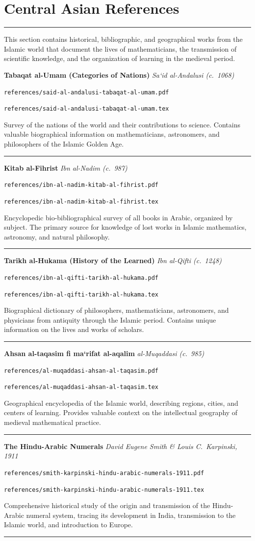 \documentclass[11pt,a4paper]{article}
\newcommand{\workitem}[5]{%
  \par\smallskip
  \noindent\textbf{\large #1} \hfill \textit{#2}\par
  \noindent\texttt{\small #3}\par
  \noindent\texttt{\small #4}\par
  \noindent #5\par
  \smallskip\noindent\rule{\textwidth}{0.2pt}
}
\newcommand{\referencesection}[1]{%
  \section[{#1}]{\textcolor{refcolor}{#1}}
}
\begin{document}
\newpage

\referencesection{Central Asian References}
\label{sec:references}

\begin{center}
\textcolor{refcolor}{\rule{0.8\textwidth}{1pt}}
\end{center}

This section contains historical, bibliographic, and geographical works from the Islamic world that document the lives of mathematicians, the transmission of scientific knowledge, and the organization of learning in the medieval period.

\workitem
  {Tabaqat al-Umam (Categories of Nations)}
  {Sa`id al-Andalusi (c.~1068)}
  {references/said-al-andalusi-tabaqat-al-umam.pdf}
  {references/said-al-andalusi-tabaqat-al-umam.tex}
  {Survey of the nations of the world and their contributions to science. Contains valuable biographical information on mathematicians, astronomers, and philosophers of the Islamic Golden Age.}

\workitem
  {Kitab al-Fihrist}
  {Ibn al-Nadim (c.~987)}
  {references/ibn-al-nadim-kitab-al-fihrist.pdf}
  {references/ibn-al-nadim-kitab-al-fihrist.tex}
  {Encyclopedic bio-bibliographical survey of all books in Arabic, organized by subject. The primary source for knowledge of lost works in Islamic mathematics, astronomy, and natural philosophy.}

\workitem
  {Tarikh al-Hukama (History of the Learned)}
  {Ibn al-Qifti (c.~1248)}
  {references/ibn-al-qifti-tarikh-al-hukama.pdf}
  {references/ibn-al-qifti-tarikh-al-hukama.tex}
  {Biographical dictionary of philosophers, mathematicians, astronomers, and physicians from antiquity through the Islamic period. Contains unique information on the lives and works of scholars.}

\workitem
  {Ahsan al-taqasim fi ma`rifat al-aqalim}
  {al-Muqaddasi (c.~985)}
  {references/al-muqaddasi-ahsan-al-taqasim.pdf}
  {references/al-muqaddasi-ahsan-al-taqasim.tex}
  {Geographical encyclopedia of the Islamic world, describing regions, cities, and centers of learning. Provides valuable context on the intellectual geography of medieval mathematical practice.}

\workitem
  {The Hindu-Arabic Numerals}
  {David Eugene Smith \& Louis C.~Karpinski, 1911}
  {references/smith-karpinski-hindu-arabic-numerals-1911.pdf}
  {references/smith-karpinski-hindu-arabic-numerals-1911.tex}
  {Comprehensive historical study of the origin and transmission of the Hindu-Arabic numeral system, tracing its development in India, transmission to the Islamic world, and introduction to Europe.}
\end{document}
